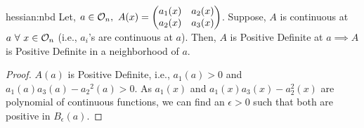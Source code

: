 \documentclass[../Analysis-3.tex]{subfiles}
\begin{document}
\begin{Lem}{}{hessian:nbd}
  Let, $a \in \mathcal{O}_{n},\ A(x) = \begin{pmatrix}
      a_1(x) & a_2(x) \\
      a_2(x) & a_3(x)
    \end{pmatrix}$. Suppose, $A$ is continuous at $a \ \forall\ x \in \mathcal{O}_{n}$ (i.e., $a_i$'s are continuous at $a$). Then, $A$ is Positive Definite at $a \implies A$ is Positive Definite in a neighborhood of $a$.
\end{Lem}

\begin{proof}
  $ A(a) $ is Positive Definite, i.e., $ a_1(a) > 0 $ and $ a_1(a) a_3(a) - {a_2}^2(a) > 0 $. As $ a_1(x) $ and $ a_1(x)a_3(x) - a_2^2(x) $ are polynomial of continuous functions, we can find an $ \epsilon > 0 $ such that both are positive in $ B_{\epsilon}(a) $.
\end{proof}
\end{document}
